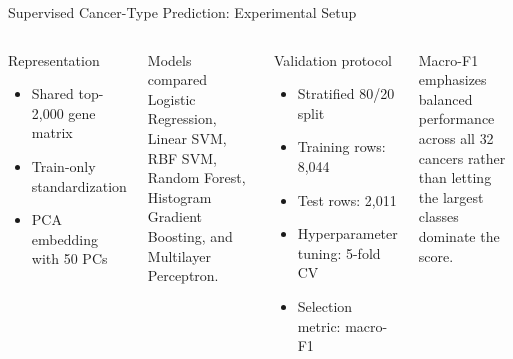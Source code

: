 \documentclass[aspectratio=169,10pt]{beamer}
\begin{document}
\begin{frame}{Supervised Cancer-Type Prediction: Experimental Setup}
  \begin{columns}[T,onlytextwidth]
      \begin{block}{Representation}
        \small
        \begin{itemize}
          \item Shared top-2,000 gene matrix
          \item Train-only standardization
          \item PCA embedding with \alert{50 PCs}
        \end{itemize}
      \end{block}
      \begin{block}{Models compared}
        \footnotesize
        Logistic Regression, Linear SVM, RBF SVM, Random Forest, Histogram Gradient Boosting, and Multilayer Perceptron.
      \end{block}
      \begin{block}{Validation protocol}
        \footnotesize
        \begin{itemize}
          \item Stratified 80/20 split
          \item Training rows: \alert{8,044}
          \item Test rows: \alert{2,011}
          \item Hyperparameter tuning: \alert{5-fold CV}
          \item Selection metric: \alert{macro-F1}
        \end{itemize}
      \end{block}
      {\footnotesize\color{DeckSoft}Macro-F1 emphasizes balanced performance across all 32 cancers rather than letting the largest classes dominate the score.\par}
    \end{columns}
\end{frame}
\end{document}

